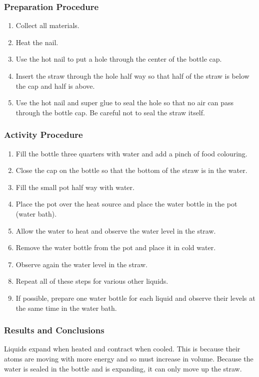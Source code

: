 \subsubsection*{Preparation Procedure}
\begin{enumerate}
\item{Collect all materials.} 
\item{Heat the nail.} 
\item{Use the hot nail to put a hole through the center of the bottle cap.} 
\item{Insert the straw through the hole half way so that half of the straw is below the cap and half is above.} 
\item{Use the hot nail and super glue to seal the hole so that no air can pass through the bottle cap. Be careful not to seal the straw itself.} 
\end{enumerate}

\subsubsection*{Activity Procedure}
\begin{enumerate}
\item{Fill the bottle three quarters with water and add a pinch of food colouring.} 
\item{Close the cap on the bottle so that the bottom of the straw is in the water.} 
\item{Fill the small pot half way with water.} 
\item{Place the pot over the heat source and place the water bottle in the pot (water bath).} 
\item{Allow the water to heat and observe the water level in the straw.} 
\item{Remove the water bottle from the pot and place it in cold water.} 
\item{Observe again the water level in the straw.} 
\item{Repeat all of these steps for various other liquids.} 
\item{If possible, prepare one water bottle for each liquid and observe their levels at the same time in the water bath.} 
\end{enumerate}

\subsubsection*{Results and Conclusions}
Liquids expand when heated and contract when cooled. This is because their atoms are moving with more energy and so must increase in volume. Because the water is sealed in the bottle and is expanding, it can only move up the straw.  

